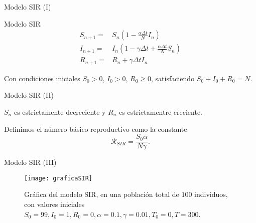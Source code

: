 \begin{frame}{Modelo SIR (I)}

    \begin{block}{Modelo SIR}
        \begin{equation}
        \label{eqn: SIR_modelo}
        \begin{aligned}
        S_{n+1} = & S_n \left(1-\frac{\alpha\Delta t}{N} I_n \right) \\
        I_{n+1} = & I_n \left( 1-\gamma \Delta t + \frac{\alpha\Delta t}{N} S_n \right) \\
        R_{n+1} = & R_n + \gamma \Delta t I_n
        \end{aligned}
        \end{equation}
        
        Con condiciones iniciales $S_0>0$, $I_0>0$, $R_0\geq 0$, satisfaciendo $S_0+I_0+R_0=N$.
    \end{block}
\end{frame}


\begin{frame}{Modelo SIR (II)}
        
        


        \begin{lema}
            $S_n$ es estrictamente decreciente y $R_n$ es estrictamentre creciente.
        \end{lema}

        \pause

        \begin{definition}
            Definimos el número básico reproductivo como la constante 
            $$\mathcal{R}_{SIR}=\frac{S_0 \alpha}{N\gamma }.$$
        \end{definition}


\end{frame}

\begin{frame}{Modelo SIR (III)}
    \begin{figure}
        \begin{center}
        \caption{Gráfica del modelo SIR, en una población total de $100$ individuos, con valores iniciales $S_0=99, I_0 = 1, R_0 = 0, \alpha = 0.1, \gamma = 0.01, T_0 = 0, T = 300$.}
        \texttt{[image: graficaSIR]}
        \end{center}
    \end{figure}
\end{frame}

